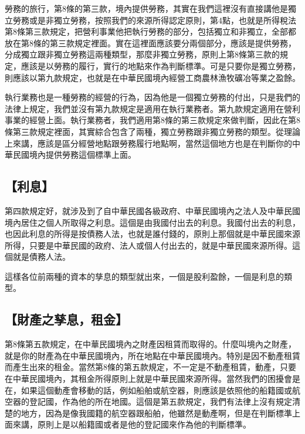 \documentclass[]{ctexbook}
\begin{document}
勞務的旅行，第8條的第三款，境內提供勞務，其實在我們這裡沒有直接講他是獨立勞務或是非獨立勞務，按照我們的來源所得認定原則，第4點，也就是所得稅法第8條第三款規定，把營利事業他把執行勞務的部分，包括獨立和非獨立，全部都放在第8條的第三款規定裡面。實在這裡面應該要分兩個部分，應該是提供勞務，分成獨立跟非獨立勞務這兩種類型，那麼非獨立勞務，原則上第8條第三款的規定，應該是以勞務的履行，實行的地點來作為判斷標準。可是只要你是獨立勞務，則應該以第九款規定，也就是在中華民國境內經營工商農林漁牧礦冶等業之盈餘。

執行業務也是一種勞務的經營的行為，因為他是一個獨立勞務的付出，只是我們的法律上規定，我們並沒有第九款規定是適用在執行業務者。第九款規定適用在營利事業的經營上面。執行業務者，我們適用第8條的第三款規定來做判斷，因此在第8條第三款規定裡面，其實綜合包含了兩種，獨立勞務跟非獨立勞務的類型。從理論上來講，應該是區分經營地點跟勞務履行地點啊，當然這個地方也是在判斷你的中華民國境內提供勞務這個標準上面。

\hypertarget{ux5229ux606f}{%
\subsection{【利息】}\label{ux5229ux606f}}

第四款規定好，就涉及到了自中華民國各級政府、中華民國境內之法人及中華民國境內居住之個人所取得之利息。這個是由我國付出去的利息。我國付出去的利息，也因此利息的所得是按債務人法，也就是誰付錢的，原則上那個就是中華民國來源所得，只要是中華民國的政府、法人或個人付出去的，就是中華民國來源所得。這個就是債務人法。

這樣各位前兩種的資本的孳息的類型就出來，一個是股利盈餘，一個是利息的類型。

\hypertarget{ux8ca1ux7522ux4e4bux5b73ux606fux79dfux91d1}{%
\subsection{【財產之孳息，租金】}\label{ux8ca1ux7522ux4e4bux5b73ux606fux79dfux91d1}}

第8條第五款規定，在中華民國境內之財產因租賃而取得的。什麼叫境內之財產，就是你的財產為在中華民國境內，所在地點在中華民國境內。特別是因不動產租賃而產生出來的租金。當然第8條的第五款規定，不一定是不動產租賃，動產，只要在中華民國境內，其租金所得原則上就是中華民國來源所得。當然我們的困擾會是在，如果這個動產會移動的話，例如船舶或航空器，則應該是依照他的船籍國或航空器的登記國，作為他的所在地國。這個是第五款規定，我們有法律上沒有規定清楚的地方，因為是像我國籍的航空器跟船舶，他雖然是動產啊，但是在判斷標準上面來講，原則上是以船籍國或者是他的登記國來作為他的判斷標準。
\end{document}
